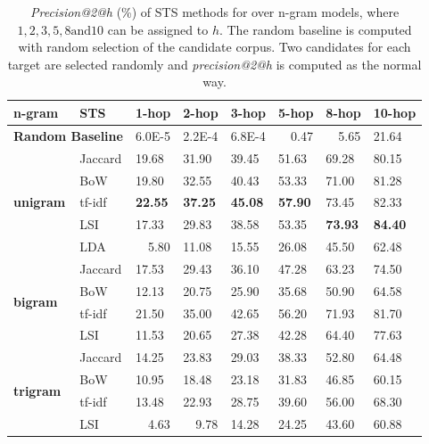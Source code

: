 \begin{table}[!htb]
\centering
\small
\begin{tabularx}{\textwidth}{XX|XXXXXX}
\textbf{n-gram} & \textbf{STS} & \textbf{1-hop} & \textbf{2-hop} & \textbf{3-hop} & \textbf{5-hop} & \textbf{8-hop} & \textbf{10-hop} \\ \hline

\multicolumn{2}{c|}{\textbf{Random Baseline}} & 6.0E-5& 2.2E-4 & 6.8E-4 & ~~0.47 & ~~5.65 & 21.64 \\ \hline

\multirow{5}{*}{\textbf{unigram}} & Jaccard & 19.68 & 31.90 & 39.45 & 51.63 & 69.28 & 80.15 \\
 & BoW & 19.80 & 32.55 & 40.43 & 53.33 & 71.00 & 81.28 \\
 & tf-idf & \textbf{22.55} & \textbf{37.25} & \textbf{45.08} & \textbf{57.90} & 73.45 & 82.33 \\
 & LSI & 17.33 & 29.83 & 38.58 & 53.35 & \textbf{73.93} & \textbf{84.40} \\
 & LDA & ~~5.80 & 11.08 & 15.55 & 26.08 & 45.50 & 62.48 \\ \hline
\multirow{4}{*}{\textbf{bigram}} & Jaccard & 17.53 & 29.43 & 36.10 & 47.28 & 63.23 & 74.50 \\
 & BoW & 12.13 & 20.75 & 25.90 & 35.68 & 50.90 & 64.58 \\
 & tf-idf & 21.50 & 35.00 & 42.65 & 56.20 & 71.93 & 81.70 \\
 & LSI & 11.53 & 20.65 & 27.38 & 42.28 & 64.40 & 77.63 \\ \hline
\multirow{4}{*}{\textbf{trigram}} & Jaccard & 14.25 & 23.83 & 29.03 & 38.33 & 52.80 & 64.48 \\
 & BoW & 10.95 & 18.48 & 23.18 & 31.83 & 46.85 & 60.15 \\
 & tf-idf & 13.48 & 22.93 & 28.75 & 39.60 & 56.00 & 68.30 \\
 & LSI & ~~4.63 & ~~9.78 & 14.28 & 24.25 & 43.60 & 60.88 \\ \hline
\end{tabularx}
\caption[\textit{Precision@2@h} (\%) of STS methods for \icontent{} over n-gram models, where $1, 2, 3, 5, 8 \text{and} 10$ can be assigned to $h$]{\textit{Precision@2@h} (\%) of STS methods for \icontent{} over n-gram models, where $1, 2, 3, 5, 8 \text{and} 10$ can be assigned to $h$. The random baseline is computed with random selection of the candidate corpus. Two candidates for each target are selected randomly and \textit{precision@2@h} is computed as the normal way. }
\label{tab:hops}
\end{table}

